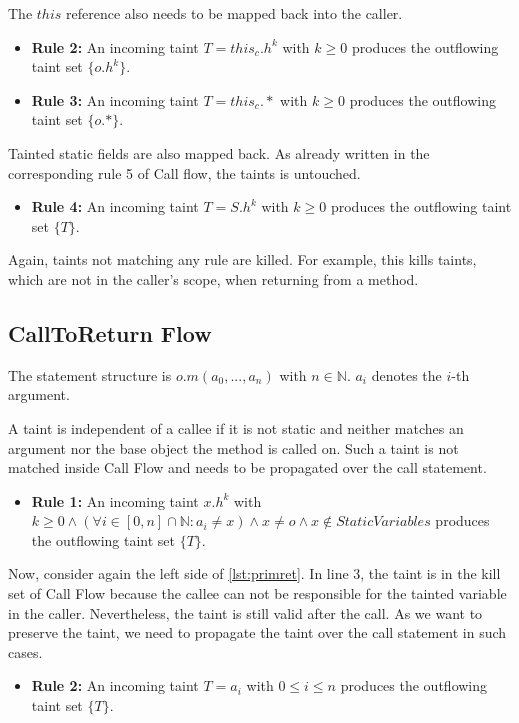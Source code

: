 \documentclass[../draft.tex]{subfiles}
\begin{document}
    The $\mathit{this}$ reference also needs to be mapped back into the caller.
    \begin{itemize}
        \item[] \textbf{Rule 2:} An incoming taint $T = \mathit{this}_c.h^k$ with $k \geq 0$ produces the outflowing taint set $\{o.h^k\}$. 
        \item[] \textbf{Rule 3:} An incoming taint $T = \mathit{this}_c.*$ with $k \geq 0$ produces the outflowing taint set $\{o.*\}$.
    \end{itemize}
    
    Tainted static fields are also mapped back. As already written in the corresponding rule 5 of Call flow, the taints is untouched.
    \begin{itemize}
        \item[] \textbf{Rule 4:} An incoming taint $T = S.h^k$ with $k \geq 0$ produces the outflowing taint set $\{T\}$. 
    \end{itemize}
    
    Again, taints not matching any rule are killed. 
    For example, this kills taints, which are not in the caller's scope, when returning from a method.

    \subsection{CallToReturn Flow}
    The statement structure is $o.m(a_0, ..., a_n)$ with $n \in \mathbb{N}$. 
    $a_i$ denotes the $i$-th argument.

    A taint is independent of a callee if it is not static and neither matches an argument nor the base object the method is called on. 
    Such a taint is not matched inside Call Flow and needs to be propagated over the call statement.
    \begin{itemize}
        \item[] \textbf{Rule 1:} An incoming taint $x.h^k$ with $k \geq 0 \land \left(\forall i \in [0, n] \cap \mathbb{N}: a_i \neq x\right) \land x \neq o \land x \notin \mathit{StaticVariables}$ produces the outflowing taint set $\{T\}$. 
    \end{itemize}

    Now, consider again the left side of \autoref{lst:primret}. 
    In line 3, the  taint is in the kill set of Call Flow because the callee can not be responsible for the tainted variable in the caller.
    Nevertheless, the taint is still valid after the call.
    As we want to preserve the taint, we need to propagate the taint over the call statement in such cases. 
    \begin{itemize}
        \item[] \textbf{Rule 2:} An incoming taint $T = a_i$ with $0 \leq i \leq n$ produces the outflowing taint set $\{T\}$. 
    \end{itemize}
\end{document}
